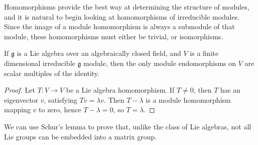 Homomorphisms provide the best way at determining the structure of modules, and it is natural to begin looking at homomorphisms of irreducible modules. Since the image of a module homomorphism is always a submodule of that module, these homomorphisms must either be trivial, or isomorphisms.

\begin{lemma}[Schur]
    If $\mathfrak{g}$ is a Lie algebra over an algebraically closed field, and $V$ is a finite dimensional irreducible $\mathfrak{g}$ module, then the only module endomorphisms on $V$ are scalar multiples of the identity.
\end{lemma}
\begin{proof}
    Let $T: V \to V$ be a Lie algebra homomorphism. If $T \neq 0$, then $T$ has an eigenvector $v$, satisfying $Tv = \lambda v$. Then $T - \lambda$ is a module homomorphism mapping $v$ to zero, hence $T - \lambda = 0$, so $T = \lambda$.
\end{proof}

We can use Schur's lemma to prove that, unlike the class of Lie algebras, not all Lie groups can be embedded into a matrix group.

